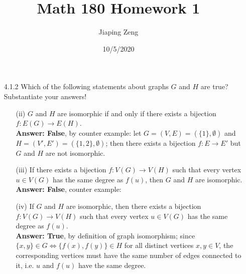 \documentclass{article}
\title{Math 180 Homework 1}
\date{10/5/2020}
\author{Jiaping Zeng}
\begin{document}
\maketitle

\begin{itemize}
    \item [4.1.2] Which of the following statements about graphs $G$ and $H$ are true? Substantiate your answers!
          \begin{itemize}
              \item [(ii)] $G$ and $H$ are isomorphic if and only if there exists a bijection $f:E(G)\rightarrow E(H)$.\\\textbf{Answer: False}, by counter example: let $G=(V,E)=(\{1\},\emptyset)$ and $H=(V',E')=(\{1,2\},\emptyset)$; then there exists a bijection $f:E\rightarrow E'$ but $G$ and $H$ are not isomorphic.
              \item [(iii)] If there exists a bijection $f:V(G)\rightarrow V(H)$ such that every vertex $u\in V(G)$ has the same degree as $f(u)$, then $G$ and $H$ are isomorphic.\\\textbf{Answer: False}, counter example:\\
                    \hspace{30px}
              \item [(iv)] If $G$ and $H$ are isomorphic, then there exists a bijection $f:V(G)\rightarrow V(H)$ such that every vertex $u\in V(G)$ has the same degree as $f(u)$.\\\textbf{Answer: True}, by definition of graph isomorphism; since $\{x,y\}\in G\Leftrightarrow \{f(x),f(y)\}\in H$ for all distinct vertices $x,y\in V$, the corresponding vertices must have the same number of edges connected to it, i.e. $u$ and $f(u)$ have the same degree.

\end{itemize}
\end{itemize}
\end{document}
